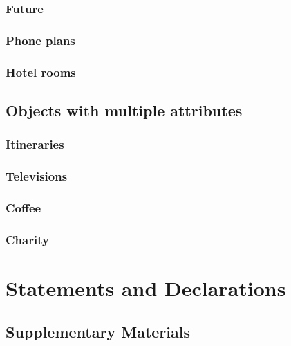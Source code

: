 \documentclass[11pt,letter]{article}
\begin{document}
\subsubsection{Future}



\subsubsection{Phone plans}



\subsubsection{Hotel rooms}



\subsection{Objects with multiple attributes}

\subsubsection{Itineraries}



\subsubsection{Televisions}



\subsubsection{Coffee}



\subsubsection{Charity}



\section*{Statements and Declarations}

\subsection*{Supplementary Materials}
\end{document}
